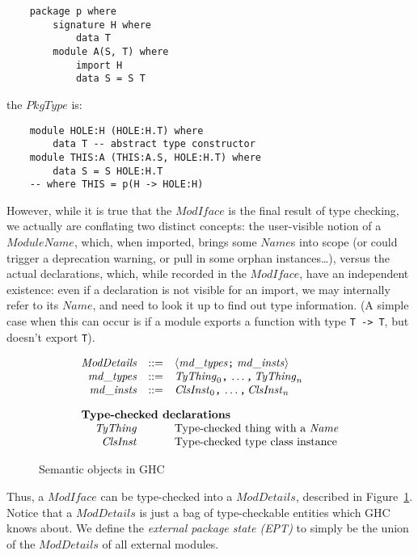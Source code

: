 \documentclass{article}
\newcommand{\I}[1]{\ensuremath{\mathit{#1}}}
\begin{document}
\begin{verbatim}
    package p where
        signature H where
            data T
        module A(S, T) where
            import H
            data S = S T
\end{verbatim}
%
the \I{PkgType} is:

\begin{verbatim}
    module HOLE:H (HOLE:H.T) where
        data T -- abstract type constructor
    module THIS:A (THIS:A.S, HOLE:H.T) where
        data S = S HOLE:H.T
    -- where THIS = p(H -> HOLE:H)
\end{verbatim}
%
However, while it is true that the \I{ModIface} is the final result
of type checking, we actually are conflating two distinct concepts: the user-visible
notion of a \I{ModuleName}, which, when imported, brings some \I{Name}s
into scope (or could trigger a deprecation warning, or pull in some
orphan instances\ldots), versus the actual declarations, which, while recorded
in the \I{ModIface}, have an independent existence: even if a declaration
is not visible for an import, we may internally refer to its \I{Name}, and
need to look it up to find out type information.  (A simple case when
this can occur is if a module exports a function with type \verb|T -> T|,
but doesn't export \verb|T|).

\begin{figure}[htpb]
$$
\begin{array}{rcll}
\I{ModDetails} & ::= & \langle\I{md\_types} \verb|;|\; \I{md\_insts}\rangle \\
\I{md\_types}  & ::= & \I{TyThing}_0 \verb|,|\, \ldots\verb|,|\, \I{TyThing}_n \\
\I{md\_insts}  & ::= & \I{ClsInst}_0 \verb|,|\, \ldots\verb|,|\, \I{ClsInst}_n \\[1em]
\multicolumn{3}{l}{\mbox{\bf Type-checked declarations}} \\
\I{TyThing}    &     & \mbox{Type-checked thing with a \I{Name}} \\
\I{ClsInst}    &     & \mbox{Type-checked type class instance} \\
\end{array}
$$
\caption{Semantic objects in GHC} \label{fig:typecheck-more}
\end{figure}

Thus, a \I{ModIface} can be type-checked into a \I{ModDetails}, described in
Figure~\ref{fig:typecheck-more}.  Notice that a \I{ModDetails} is just
a bag of type-checkable entities which GHC knows about.  We
define the \emph{external package state (EPT)} to
simply be the union of the \I{ModDetails}
of all external modules.
\end{document}
